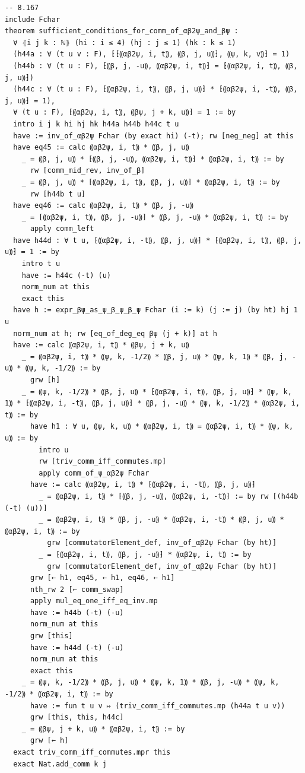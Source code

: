 \begin{Verbatim}
-- 8.167
include Fchar
theorem sufficient_conditions_for_comm_of_αβ2ψ_and_βψ :
  ∀ ⦃i j k : ℕ⦄ (hi : i ≤ 4) (hj : j ≤ 1) (hk : k ≤ 1)
  (h44a : ∀ (t u v : F), ⁅⁅⸨αβ2ψ, i, t⸩, ⸨β, j, u⸩⁆, ⸨ψ, k, v⸩⁆ = 1)
  (h44b : ∀ (t u : F), ⁅⸨β, j, -u⸩, ⸨αβ2ψ, i, t⸩⁆ = ⁅⸨αβ2ψ, i, t⸩, ⸨β, j, u⸩⁆)
  (h44c : ∀ (t u : F), ⁅⸨αβ2ψ, i, t⸩, ⸨β, j, u⸩⁆ * ⁅⸨αβ2ψ, i, -t⸩, ⸨β, j, u⸩⁆ = 1),
  ∀ (t u : F), ⁅⸨αβ2ψ, i, t⸩, ⸨βψ, j + k, u⸩⁆ = 1 := by
  intro i j k hi hj hk h44a h44b h44c t u
  have := inv_of_αβ2ψ Fchar (by exact hi) (-t); rw [neg_neg] at this
  have eq45 := calc ⸨αβ2ψ, i, t⸩ * ⸨β, j, u⸩
    _ = ⸨β, j, u⸩ * ⁅⸨β, j, -u⸩, ⸨αβ2ψ, i, t⸩⁆ * ⸨αβ2ψ, i, t⸩ := by
      rw [comm_mid_rev, inv_of_β]
    _ = ⸨β, j, u⸩ * ⁅⸨αβ2ψ, i, t⸩, ⸨β, j, u⸩⁆ * ⸨αβ2ψ, i, t⸩ := by
      rw [h44b t u]
  have eq46 := calc ⸨αβ2ψ, i, t⸩ * ⸨β, j, -u⸩
    _ = ⁅⸨αβ2ψ, i, t⸩, ⸨β, j, -u⸩⁆ * ⸨β, j, -u⸩ * ⸨αβ2ψ, i, t⸩ := by
      apply comm_left
  have h44d : ∀ t u, ⁅⸨αβ2ψ, i, -t⸩, ⸨β, j, u⸩⁆ * ⁅⸨αβ2ψ, i, t⸩, ⸨β, j, u⸩⁆ = 1 := by
    intro t u
    have := h44c (-t) (u)
    norm_num at this
    exact this
  have h := expr_βψ_as_ψ_β_ψ_β_ψ Fchar (i := k) (j := j) (by ht) hj 1 u
  norm_num at h; rw [eq_of_deg_eq βψ (j + k)] at h
  have := calc ⸨αβ2ψ, i, t⸩ * ⸨βψ, j + k, u⸩
    _ = ⸨αβ2ψ, i, t⸩ * ⸨ψ, k, -1/2⸩ * ⸨β, j, u⸩ * ⸨ψ, k, 1⸩ * ⸨β, j, -u⸩ * ⸨ψ, k, -1/2⸩ := by
      grw [h]
    _ = ⸨ψ, k, -1/2⸩ * ⸨β, j, u⸩ * ⁅⸨αβ2ψ, i, t⸩, ⸨β, j, u⸩⁆ * ⸨ψ, k, 1⸩ * ⁅⸨αβ2ψ, i, -t⸩, ⸨β, j, u⸩⁆ * ⸨β, j, -u⸩ * ⸨ψ, k, -1/2⸩ * ⸨αβ2ψ, i, t⸩ := by
      have h1 : ∀ u, ⸨ψ, k, u⸩ * ⸨αβ2ψ, i, t⸩ = ⸨αβ2ψ, i, t⸩ * ⸨ψ, k, u⸩ := by
        intro u
        rw [triv_comm_iff_commutes.mp]
        apply comm_of_ψ_αβ2ψ Fchar
      have := calc ⸨αβ2ψ, i, t⸩ * ⁅⸨αβ2ψ, i, -t⸩, ⸨β, j, u⸩⁆
        _ = ⸨αβ2ψ, i, t⸩ * ⁅⸨β, j, -u⸩, ⸨αβ2ψ, i, -t⸩⁆ := by rw [(h44b (-t) (u))]
        _ = ⸨αβ2ψ, i, t⸩ * ⸨β, j, -u⸩ * ⸨αβ2ψ, i, -t⸩ * ⸨β, j, u⸩ * ⸨αβ2ψ, i, t⸩ := by
          grw [commutatorElement_def, inv_of_αβ2ψ Fchar (by ht)]
        _ = ⁅⸨αβ2ψ, i, t⸩, ⸨β, j, -u⸩⁆ * ⸨αβ2ψ, i, t⸩ := by
          grw [commutatorElement_def, inv_of_αβ2ψ Fchar (by ht)]
      grw [← h1, eq45, ← h1, eq46, ← h1]
      nth_rw 2 [← comm_swap]
      apply mul_eq_one_iff_eq_inv.mp
      have := h44b (-t) (-u)
      norm_num at this
      grw [this]
      have := h44d (-t) (-u)
      norm_num at this
      exact this
    _ = ⸨ψ, k, -1/2⸩ * ⸨β, j, u⸩ * ⸨ψ, k, 1⸩ * ⸨β, j, -u⸩ * ⸨ψ, k, -1/2⸩ * ⸨αβ2ψ, i, t⸩ := by
      have := fun t u v ↦ (triv_comm_iff_commutes.mp (h44a t u v))
      grw [this, this, h44c]
    _ = ⸨βψ, j + k, u⸩ * ⸨αβ2ψ, i, t⸩ := by
      grw [← h]
  exact triv_comm_iff_commutes.mpr this
  exact Nat.add_comm k j


\end{Verbatim}
